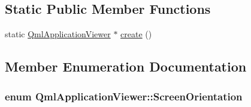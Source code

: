 \subsection*{Static Public Member Functions}
\begin{DoxyCompactItemize}
\item 
static \hyperlink{classQmlApplicationViewer}{Qml\-Application\-Viewer} $\ast$ \hyperlink{classQmlApplicationViewer_a8287b2c20182a8dd7b60608f84dec496}{create} ()
\end{DoxyCompactItemize}


\subsection{Member Enumeration Documentation}
\hypertarget{classQmlApplicationViewer_ac7c7e3771e785af566efd57ef319ac0b}{
\subsubsection[{Screen\-Orientation}]{\setlength{\rightskip}{0pt plus 5cm}enum {\bf Qml\-Application\-Viewer\-::\-Screen\-Orientation}}}\label{classQmlApplicationViewer_ac7c7e3771e785af566efd57ef319ac0b}
